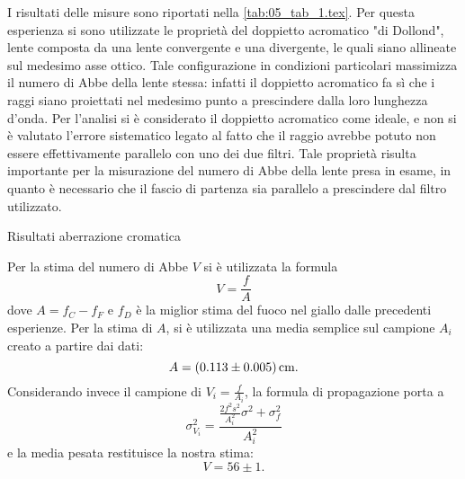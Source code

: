 I risultati delle misure sono riportati nella \autoref{tab:05_tab_1.tex}. 
Per questa esperienza si sono utilizzate le proprietà del doppietto 
acromatico "di Dollond", lente composta da una lente convergente e 
una divergente, le quali siano allineate sul medesimo asse ottico. 
Tale configurazione in condizioni particolari massimizza il numero 
di Abbe della lente stessa: infatti il doppietto acromatico fa 
sì che i raggi siano proiettati nel medesimo punto a prescindere 
dalla loro lunghezza d'onda. Per l'analisi si è considerato il 
doppietto acromatico come ideale, e non si è valutato l'errore 
sistematico legato al fatto che il raggio avrebbe potuto non essere 
effettivamente parallelo con uno dei due filtri. Tale proprietà 
risulta importante per la misurazione del numero di Abbe della lente 
presa in esame, in quanto è necessario che il fascio di partenza sia 
parallelo a prescindere dal filtro utilizzato.
\begin{tabella}
	\centering
	
	\caption{Risultati aberrazione cromatica}
	\label{tab:05_tab_1.tex}
\end{tabella}

Per la stima del numero di Abbe $V$ si \`e utilizzata la formula
\[ V=\frac{f}{A} \]
dove \(A= f_C - f_F\) e $f_D$ \`e la miglior stima del fuoco nel 
giallo dalle precedenti esperienze. Per la stima di $A$, si è
utilizzata una media semplice sul campione ${A_i}$ creato a partire 
dai dati:
\[ A = (0.113 \pm 0.005) \,\mathrm{cm} .\]
Considerando invece il campione di \( V_i=\frac{f}{A_i} \), la formula di propagazione porta a 
\[  \sigma^2_{V_i} = \frac{
\frac{2f^2   s^2}{A_i^2}   \sigma^2 +  \sigma^2_{f}
}{A_i^2} \]
e la media pesata restituisce la nostra stima:
\[V= 56 \pm 1 .\]
